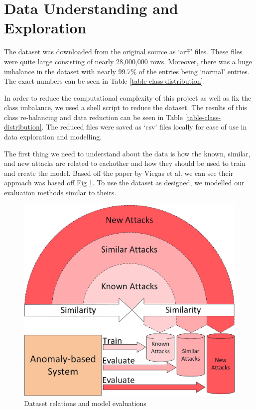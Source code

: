 \section{Data Understanding and Exploration}
\label{data-understanding-and-exploation}
The dataset was downloaded from the original source as `arff' files. These files were quite large consisting of nearly 28,000,000 rows. Moreover, there was a huge imbalance in the dataset with nearly 99.7\% of the entries being `normal' entries. The exact numbers can be seen in Table \ref{table-class-distribution}.



In order to reduce the computational complexity of this project as well as fix the class imbalance, we used a shell script to reduce the dataset. The results of this class re-balancing and data reduction can be seen in Table \ref{table-class-distribution}. The reduced files were saved as `csv' files locally for ease of use in data exploration and modelling. 


The first thing we need to understand about the data is how the known, similar, and new attacks are related to eachother and how they should be used to train and create the model. Based off the paper by Viegas et al. we can see their approach was based off Fig \ref{figure-known-similar-new}.\cite{viegas2017toward} To use the dataset as designed, we modelled our evaluation methods similar to theirs.

\begin{figure}[!htb]
    \centering
    \includegraphics{figures/uploads/known_similar_new_attacks.jpg}
    \caption{Dataset relations and model evaluations}
    \label{figure-known-similar-new}
\end{figure}

